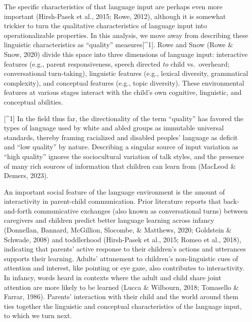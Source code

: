 \documentclass[
  man,floatsintext]{apa6}
\begin{document}
The specific characteristics of that language input are perhaps even more important (Hirsh-Pasek et al., 2015; Rowe, 2012), although it is somewhat trickier to turn the qualitative characteristics of language input into operationalizable properties. In this analysis, we move away from describing these linguistic characteristics as ``quality'' measures{[}\^{}1{]}. Rowe and Snow (Rowe \& Snow, 2020) divide this space into three dimensions of language input: interactive features (e.g., parent responsiveness, speech directed \emph{to} child vs.~overheard; conversational turn-taking), linguistic features (e.g., lexical diversity, grammatical complexity), and conceptual features (e.g., topic diversity). These environmental features at various stages interact with the child's own cognitive, linguistic, and conceptual abilities.

{[}\^{}1{]} In the field thus far, the directionality of the term ``quality'' has favored the types of language used by white and abled groups as immutable universal standards, thereby framing racialized and disabled peoples' language as deficit and ``low quality'' by nature. Describing a singular source of input variation as ``high quality'' ignores the sociocultural variation of talk styles, and the presence of many rich sources of information that children can learn from (MacLeod \& Demers, 2023).

An important social feature of the language environment is the amount of interactivity in parent-child communication. Prior literature reports that back-and-forth communicative exchanges (also known as conversational turns) between caregivers and children predict better language learning across infancy (Donnellan, Bannard, McGillion, Slocombe, \& Matthews, 2020; Goldstein \& Schwade, 2008) and toddlerhood (Hirsh-Pasek et al., 2015; Romeo et al., 2018), indicating that parents' active response to their children's actions and utterances supports their learning. Adults' attunement to children's non-linguistic cues of attention and interest, like pointing or eye gaze, also contributes to interactivity. In infancy, words heard in contexts where the adult and child share joint attention are more likely to be learned (Lucca \& Wilbourn, 2018; Tomasello \& Farrar, 1986). Parents' interaction with their child and the world around them ties together the linguistic and conceptual characteristics of the language input, to which we turn next.
\end{document}
